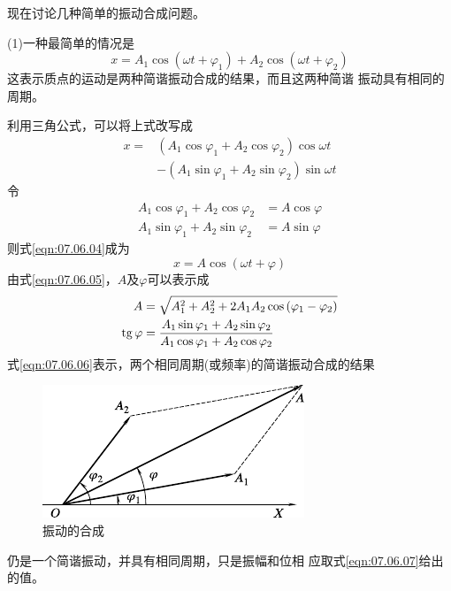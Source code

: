 现在讨论几种简单的振动合成问题。

(1)一种最简单的情况是
\begin{equation}\label{eqn:07.06.03}
  x = A _ { 1 } \cos \left( \omega t + \varphi _ { 1 } \right) + A _ { 2 } \cos \left( \omega t + \varphi _ { 2 } \right)
\end{equation}
这表示质点的运动是两种简谐振动合成的结果，而且这两种简谐
振动具有相同的周期。

利用三角公式，可以将上式改写成
\begin{equation}\label{eqn:07.06.04}
  \begin{aligned}
    x = & \left( A _ { 1 } \cos \varphi _ { 1 } + A _ { 2 } \cos \varphi _ { 2 } \right) \cos \omega t   \\
        & - \left( A _ { 1 } \sin \varphi _ { 1 } + A _ { 2 } \sin \varphi _ { 2 } \right) \sin \omega t
  \end{aligned}
\end{equation}
令
\begin{equation}\label{eqn:07.06.05}
  \begin{aligned}
    A _ { 1 } \cos \varphi _ { 1 } + A _ { 2 } \cos \varphi _ { 2 } & = A \cos \varphi \\
    A _ { 1 } \sin \varphi _ { 1 } + A _ { 2 } \sin \varphi _ { 2 } & = A \sin \varphi
  \end{aligned}
\end{equation}
则式\eqref{eqn:07.06.04}成为
\begin{equation}\label{eqn:07.06.06}
  x = A \cos \left( \omega t + \varphi \right)
\end{equation}
由式\ref{eqn:07.06.05}，$ A $及$ \varphi $可以表示成
\begin{equation}\label{eqn:07.06.07}
  \begin{split}
    A &= \sqrt { A _ { 1 } ^ { 2 } + A _ 2 ^ { 2 } + 2 A _ { 1 } A _ { 2 } \cos \left( \varphi _ { 1 } - \varphi _ { 2 } \right) } \\
    \operatorname{tg} \varphi &= \frac { A _ { 1 } \sin \varphi _ { 1 } + A _ { 2 } \sin \varphi _ { 2 } } { A _ { 1 } \cos \varphi _ { 1 } + A _ { 2 } \cos \varphi _ { 2 } }
  \end{split}
\end{equation}
式\eqref{eqn:07.06.06}表示，两个相同周期(或频率)的简谐振动合成的结果
\begin{figure}
  \vspace{-1em}
  \centering
  \includegraphics{figure/fig07.11}
  \caption{振动的合成}
  \label{fig:07.11}
\end{figure}
仍是一个简谐振动，并具有相同周期，只是振幅和位相
应取式\eqref{eqn:07.06.07}给出的值。

